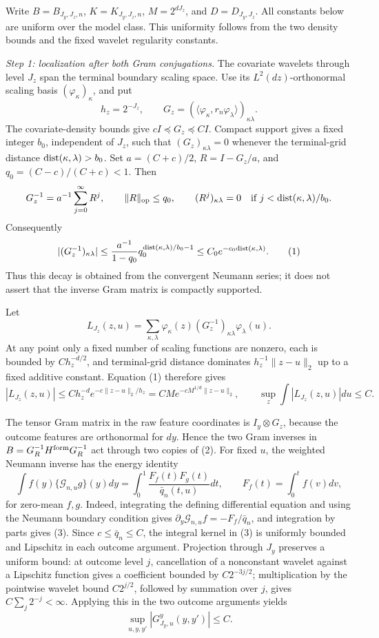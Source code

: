 Write \(B=B_{J_y,J_z,n}\), \(K=K_{J_y,J_z,n}\), \(M=2^{dJ_z}\), and \(D=D_{J_y,J_z}\).  All constants below are uniform over the model class.  This uniformity follows from the two density bounds and the fixed wavelet regularity constants.

\emph{Step 1: localization after both Gram conjugations.}
The covariate wavelets through level \(J_z\) span the terminal boundary scaling space.  Use its \(L^2(dz)\)-orthonormal scaling basis \((\varphi_\kappa)_\kappa\), and put
\[
h_z=2^{-J_z},\qquad
G_z=(\langle\varphi_\kappa,r_n\varphi_\lambda\rangle)_{\kappa\lambda}.
\]
The covariate-density bounds give \(cI\preceq G_z\preceq CI\).  Compact support gives a fixed integer \(b_0\), independent of \(J_z\), such that \((G_z)_{\kappa\lambda}=0\) whenever the terminal-grid distance \({\rm dist}(\kappa,\lambda)>b_0\).  Set \(a=(C+c)/2\), \(R=I-G_z/a\), and \(q_0=(C-c)/(C+c)<1\).  Then
\[
G_z^{-1}=a^{-1}\sum_{j=0}^{\infty}R^j,
\qquad \|R\|_{\rm op}\le q_0,
\qquad (R^j)_{\kappa\lambda}=0\quad
\text{if }j<{\rm dist}(\kappa,\lambda)/b_0.
\]
Consequently
\[
|(G_z^{-1})_{\kappa\lambda}|
\le \frac{a^{-1}}{1-q_0}
q_0^{{\rm dist}(\kappa,\lambda)/b_0-1}
\le C_0e^{-c_0{\rm dist}(\kappa,\lambda)}.                 \tag{1}
\]
Thus this decay is obtained from the convergent Neumann series; it does not assert that the inverse Gram matrix is compactly supported.

Let
\[
L_{J_z}(z,u)=\sum_{\kappa,\lambda}
\varphi_\kappa(z)(G_z^{-1})_{\kappa\lambda}\varphi_\lambda(u).
\]
At any point only a fixed number of scaling functions are nonzero, each is bounded by \(C h_z^{-d/2}\), and terminal-grid distance dominates \(h_z^{-1}\|z-u\|_2\) up to a fixed additive constant.  Equation (1) therefore gives
\[
|L_{J_z}(z,u)|\le C h_z^{-d}e^{-c\|z-u\|_2/h_z}
=CM e^{-cM^{1/d}\|z-u\|_2},
\qquad
\sup_z\int |L_{J_z}(z,u)|du\le C.                           \tag{2}
\]

The tensor Gram matrix in the raw feature coordinates is \(I_y\otimes G_z\), because the outcome features are orthonormal for \(dy\).  Hence the two Gram inverses in \(B=G_R^{-1}H^{\rm form}G_R^{-1}\) act through two copies of (2).  For fixed \(u\), the weighted Neumann inverse has the energy identity
\[
\int f(y)\{\mathcal G_{n,u}g\}(y)dy
=\int_0^1\frac{F_f(t)F_g(t)}{\bar q_n(t,u)}dt,
\qquad F_f(t)=\int_0^t f(v)dv,                              \tag{3}
\]
for zero-mean \(f,g\).  Indeed, integrating the defining differential equation and using the Neumann boundary condition gives
\(\partial_y\mathcal G_{n,u}f=-F_f/\bar q_n\), and integration by parts gives (3).  Since \(c\le\bar q_n\le C\), the integral kernel in (3) is uniformly bounded and Lipschitz in each outcome argument.  Projection through \(J_y\) preserves a uniform bound: at outcome level \(j\), cancellation of a nonconstant wavelet against a Lipschitz function gives a coefficient bounded by \(C2^{-3j/2}\); multiplication by the pointwise wavelet bound \(C2^{j/2}\), followed by summation over \(j\), gives \(C\sum_j2^{-j}<\infty\).  Applying this in the two outcome arguments yields
\[
\sup_{u,y,y'}|G^y_{J_y,u}(y,y')|\le C.                       \tag{4}
\]

